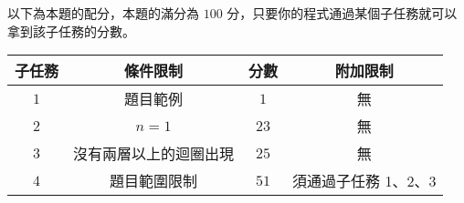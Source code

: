 以下為本題的配分，本題的滿分為 $100$ 分，只要你的程式通過某個子任務就可以拿到該子任務的分數。

\begin{center}
  \begin{tabular}{ | c | c | c | c | } \hline
    \bf{子任務} &
    \bf{條件限制} &
    \bf{分數} &
    \bf{附加限制} \\ \hline
    $1$ & 題目範例 & $1$ & 無 \\ \hline
    $2$ & $n = 1$ & $23$ & 無 \\ \hline
    $3$ & 沒有兩層以上的迴圈出現 & $25$ & 無 \\ \hline
    $4$ & 題目範圍限制 & $51$ & 須通過子任務 1、2、3 \\ \hline
    \end{tabular}
\end{center}
